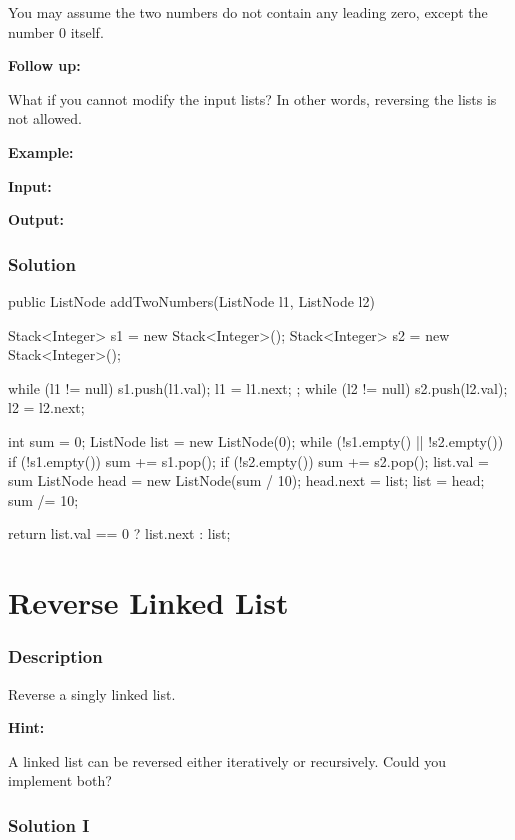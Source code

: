 You may assume the two numbers do not contain any leading zero, except the number 0 itself.

\textbf{Follow up:}

What if you cannot modify the input lists? In other words, reversing the lists is not allowed.

\textbf{Example:}

\textbf{Input:} 

\textbf{Output:} 
\subsubsection{Solution}

\begin{Code}
public ListNode addTwoNumbers(ListNode l1, ListNode l2) {
    Stack<Integer> s1 = new Stack<Integer>();
    Stack<Integer> s2 = new Stack<Integer>();

    while (l1 != null) {
        s1.push(l1.val);
        l1 = l1.next;
    }
    ;
    while (l2 != null) {
        s2.push(l2.val);
        l2 = l2.next;
    }

    int sum = 0;
    ListNode list = new ListNode(0);
    while (!s1.empty() || !s2.empty()) {
        if (!s1.empty()) sum += s1.pop();
        if (!s2.empty()) sum += s2.pop();
        list.val = sum %
        ListNode head = new ListNode(sum / 10);
        head.next = list;
        list = head;
        sum /= 10;
    }

    return list.val == 0 ? list.next : list;
}
\end{Code}

\newpage

\section{Reverse Linked List} %

\subsubsection{Description}
Reverse a singly linked list.

\textbf{Hint:}

A linked list can be reversed either iteratively or recursively. Could you implement both?

\subsubsection{Solution I}

